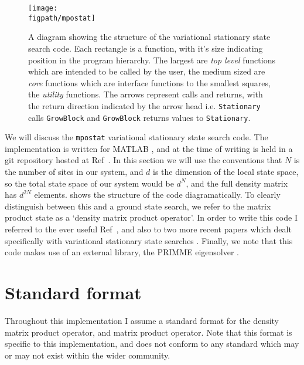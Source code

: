 \begin{figure}[ht!]
 \centering
 \texttt{[image: \\figpath/mpostat]}
 \caption{A diagram showing the structure of the variational stationary state search code. Each rectangle is a function, with it's size indicating position in the program hierarchy. The largest are \emph{top level} functions which are intended to be called by the user, the medium sized are \emph{core} functions which are interface functions to the smallest squares, the \emph{utility} functions. The arrows represent calls and returns, with the return direction indicated by the arrow head i.e. \lstinline$Stationary$ calls \lstinline$GrowBlock$ and \lstinline$GrowBlock$ returns values to \lstinline$Stationary$. }
 \label{fig:vs2-2}
 \end{figure}

 We will discuss the \lstinline$mpostat$ variational stationary state search code. The implementation is written for MATLAB \cite{MATLAB}, and at the time of writing is held in a git repository hosted at Ref~\cite{otb:gitVSSS}. In this section we will use the conventions that \(N\) is the number of sites in our system, and \(d\) is the dimension of the local state space, so the total state space of our system would be \(d^{N}\), and the full density matrix has \(d^{2N}\) elements.  shows the structure of the code diagramatically. To clearly distinguish between this and a ground state search, we refer to the matrix product state as a `density matrix product operator'. In order to write this code I referred to the ever useful Ref~\cite{Schollwock2011}, and also to two more recent papers which dealt specifically with variational stationary state searches \cite{Cui2015,Mascarenhas2015}. Finally, we note that this code makes use of an external library, the PRIMME eigensolver \cite{Stathopoulos2010,Wu2017}.

 \section{Standard format}
 Throughout this implementation I assume a standard format for the density matrix product operator, and matrix product operator. Note that this format is specific to this implementation, and does not conform to any standard which may or may not exist within the wider community.
